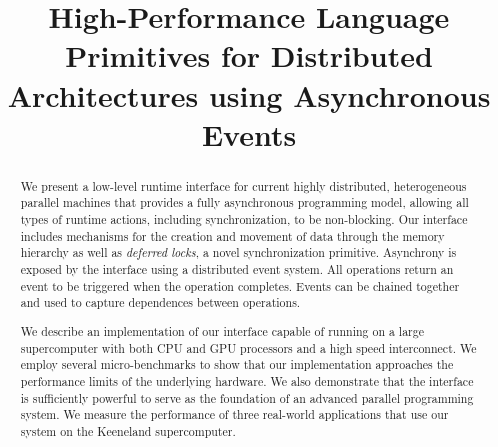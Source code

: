 \documentclass[9pt,nocopyrightspace,preprint]{sigplanconf}
\begin{document}
\title{High-Performance Language Primitives for Distributed Architectures using Asynchronous Events}
\authorinfo{}{}{}
\maketitle

\begin{abstract}
We present a low-level runtime interface for current highly distributed, heterogeneous
parallel machines that provides a fully asynchronous 
programming model, allowing all types of runtime actions, including synchronization,
to be non-blocking.  Our interface includes mechanisms for the creation and movement
of data through the memory hierarchy as well as {\em deferred locks}, a novel synchronization primitive.
Asynchrony is exposed by the interface using a distributed event system.  All
operations return an event to be triggered when the operation completes.  Events
can be chained together and used to capture dependences between operations.

We describe an implementation of our interface capable of running on
a large supercomputer with both CPU and GPU processors and a high speed interconnect.
We employ several micro-benchmarks to show that our implementation approaches
the performance limits of the underlying hardware.
We also demonstrate that the interface is sufficiently powerful to serve as the foundation 
of an advanced parallel programming system.  We measure the performance of three real-world applications
that use our system on the Keeneland supercomputer.
\end{abstract}

%









{

}
\end{document}
